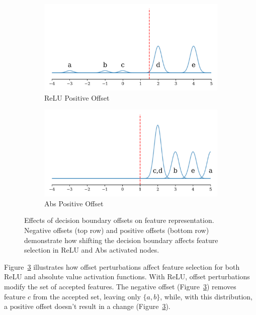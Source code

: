 \begin{figure}[ht]
    \begin{subfigure}[b]{0.49\textwidth}
        \centering
        \includegraphics[width=\textwidth]{images/offset_relu_pos}
        \caption{ReLU Positive Offset}
        \label{fig:relu_offset_up}
    \end{subfigure}
    \hfill
    \begin{subfigure}[b]{0.49\textwidth}
        \centering
        \includegraphics[width=\textwidth]{images/offset_abs_pos}
        \caption{Abs Positive Offset}
        \label{fig:abs_offset_up}
    \end{subfigure}

    \caption{Effects of decision boundary offsets on feature representation. Negative offsets (top row) and positive offsets (bottom row) demonstrate how shifting the decision boundary affects feature selection in ReLU and Abs activated nodes.}
    \label{fig:offset_demo}
\end{figure}

Figure~\ref{fig:offset_demo} illustrates how offset perturbations affect feature selection for both ReLU and absolute value activation functions. With ReLU, offset perturbations modify the set of accepted features. The negative offset (Figure~\ref{fig:offset_demo}) removes feature $c$ from the accepted set, leaving only $\{a,b\}$, while, with this distribution, a positive offset doesn't result in a change (Figure~\ref{fig:offset_demo}). 

